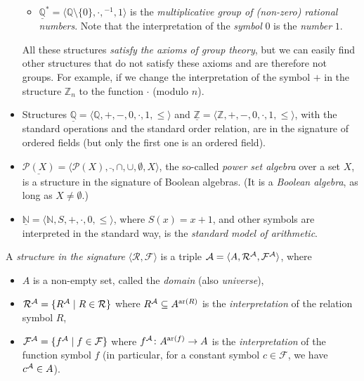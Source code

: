 \begin{example}
\begin{itemize}
\begin{itemize}
        \item $\underline{\mathbb Q}^*=\langle \mathbb Q\setminus\{0\},\cdot,{}^{-1},1\rangle$ is the \emph{multiplicative group of (non-zero) rational numbers}. Note that the interpretation of the \emph{symbol} $0$ is the \emph{number} $1$.
    \end{itemize}
    All these structures \emph{satisfy the axioms of group theory}, but we can easily find other structures that do not satisfy these axioms and are therefore not groups. For example, if we change the interpretation of the symbol $+$ in the structure $\mathbb Z_n$ to the function $\cdot$ (modulo $n$).
    \item Structures $\underline{\mathbb Q}=\langle \mathbb Q, +, -, 0,\cdot,1,\leq\rangle$ and $\underline{\mathbb Z}=\langle \mathbb Z, +, -, 0,\cdot,1,\leq\rangle$, with the standard operations and the standard order relation, are in the signature of ordered fields (but only the first one is an ordered field).
    \item $\underline{\mathcal P(X)}=\langle \mathcal P(X),\bar{},\cap,\cup,\emptyset,X\rangle$, the so-called \emph{power set algebra} over a set $X$, is a structure in the signature of Boolean algebras. (It is a \emph{Boolean algebra}, as long as $X\neq\emptyset$.)
    \item $\underline{\mathbb N}=\langle \mathbb N,S,+,\cdot,0,\leq\rangle$, where $S(x)=x+1$, and other symbols are interpreted in the standard way, is the \emph{standard model of arithmetic}.
\end{itemize}
\end{example}

\begin{definition}[Structure]
A \emph{structure in the signature} $\langle\mathcal R,\mathcal F\rangle$ is a triple $\mathcal{A}=\langle A, \mathcal R^{\mathcal{A}},\mathcal F^{\mathcal{A}} \rangle$, where
\begin{itemize}
   \item  $A$ is a non-empty set, called the \emph{domain} (also \emph{universe}),
   \item $\mathcal R^{\mathcal{A}}=\{R^{\mathcal{A}}\mid R\in\mathcal R\}$ where $R^{\mathcal{A}}\subseteq A^{\mathrm{ar}(R)}$ is the \emph{interpretation} of the relation symbol $R$,
   \item $\mathcal F^{\mathcal{A}}=\{f^{\mathcal{A}}\mid f\in\mathcal F\}$ where $f^{\mathcal{A}}\colon A^{\mathrm{ar}(f)}\to A$ is the \emph{interpretation} of the function symbol $f$ (in particular, for a constant symbol $c\in\mathcal F$, we have $c^{\mathcal{A}}\in A$).
\end{itemize}
\end{definition}

